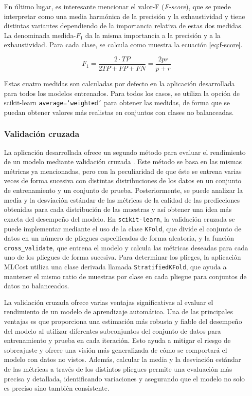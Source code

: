 En último lugar, es interesante mencionar el valor-F (\emph{F-score}), que se puede interpretar como una media harmónica de la precisión y la exhaustividad y tiene distintas variantes dependiendo de la importancia relativa de estas dos medidas. La denominada medida-$F_1$ da la misma importancia a la precisión y a la exhaustividad. Para cada clase, se calcula como muestra la ecuación \ref{eq:f-score}.

\begin{equation}
    F_1 = \dfrac{2\cdot TP}{2TP + FP + FN} = \dfrac{2pr}{p+r}
\label{eq:f-score}
\end{equation}

Estas cuatro medidas son calculadas por defecto en la aplicación desarrollada para todos los modelos entrenados. Para todos los casos, se utiliza la opción de scikit-learn \texttt{average='weighted'} para obtener las medidas, de forma que se puedan obtener valores más realistas en conjuntos con clases no balanceadas.

\subsubsection{Validación cruzada}

La aplicación desarrollada ofrece un segundo método para evaluar el rendimiento de un modelo mediante validación cruzada \cite{kuhn2013applied,raschka2018}. Este método se basa en las mismas métricas ya mencionadas, pero con la peculiaridad de que éste se entrena varias veces de forma sucesiva con distintas distribuciones de los datos en un conjunto de entrenamiento y un conjunto de prueba. Posteriormente, se puede analizar la media y la desviación estándar de las métricas de la calidad de las predicciones obtenidas para cada distribución de las muestras y así obtener una idea más exacta del desempeño del modelo. En \texttt{scikit-learn}, la validación cruzada se puede implementar mediante el uso de la clase \texttt{KFold}, que divide el conjunto de datos en un número de pliegues especificados de forma aleatoria, y la función \texttt{cross\_validate}, que entrena el modelo y calcula las métricas deseadas para cada uno de los pliegues de forma sucesiva. Para determinar los plieges, la aplicación MLCost utiliza una clase derivada llamada \texttt{StratifiedKFold}, que ayuda a mantener el mismo ratio de muestras por clase en cada pliegue para conjuntos de datos no balanceados.

La validación cruzada ofrece varias ventajas significativas al evaluar el rendimiento de un modelo de aprendizaje automático. Una de las principales ventajas es que proporciona una estimación más robusta y fiable del desempeño del modelo al utilizar diferentes subconjuntos del conjunto de datos para entrenamiento y prueba en cada iteración. Esto ayuda a mitigar el riesgo de sobreajuste y ofrece una visión más generalizada de cómo se comportará el modelo con datos no vistos. Además, calcular la media y la desviación estándar de las métricas a través de los distintos pliegues permite una evaluación más precisa y detallada, identificando variaciones y asegurando que el modelo no solo es preciso sino también consistente.

